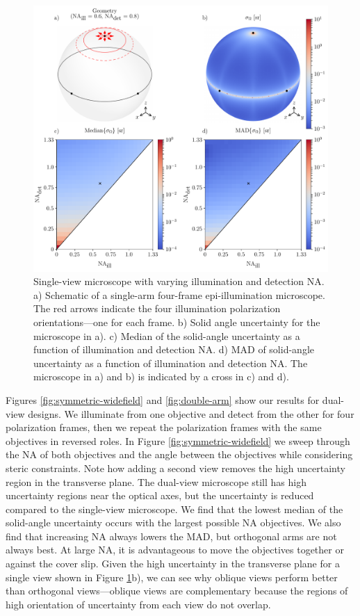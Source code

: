 \documentclass[10pt]{article}
\begin{document}
\begin{figure}[htbp]
\centering\includegraphics[width=\textwidth]{single-arm}
\caption{Single-view microscope with varying illumination and detection
  NA. a) Schematic of a single-arm four-frame epi-illumination microscope. The
  red arrows indicate the four illumination polarization orientations---one for
  each frame. b) Solid angle uncertainty for the microscope in a). c) Median of
  the solid-angle uncertainty as a function of illumination and detection NA. d)
  MAD of solid-angle uncertainty as a function of illumination and detection
  NA. The microscope in a) and b) is indicated by a cross in c) and d).}
\label{fig:single-arm}
\end{figure}

Figures \ref{fig:symmetric-widefield} and \ref{fig:double-arm} show our results
for dual-view designs. We illuminate from one objective and detect from the
other for four polarization frames, then we repeat the polarization frames with
the same objectives in reversed roles. In Figure \ref{fig:symmetric-widefield}
we sweep through the NA of both objectives and the angle between the objectives
while considering steric constraints. Note how adding a second view removes the
high uncertainty region in the transverse plane. The dual-view microscope still
has high uncertainty regions near the optical axes, but the uncertainty is
reduced compared to the single-view microscope. We find that the lowest median
of the solid-angle uncertainty occurs with the largest possible NA
objectives. We also find that increasing NA always lowers the MAD, but
orthogonal arms are not always best. At large NA, it is advantageous to move the
objectives together or against the cover slip. Given the high uncertainty in the
transverse plane for a single view shown in Figure \ref{fig:single-arm}b), we
can see why oblique views perform better than orthogonal views---oblique views
are complementary because the regions of high orientation of uncertainty from
each view do not overlap.
\end{document}
